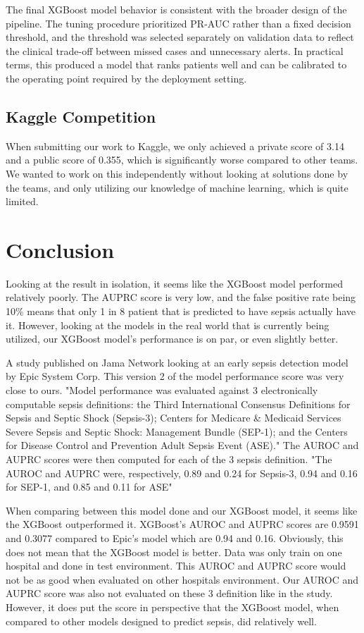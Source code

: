 \documentclass{article}
\begin{document}
The final XGBoost model behavior is consistent with the broader design of the pipeline. 
The tuning procedure prioritized PR-AUC rather than a fixed decision threshold, 
and the threshold was selected separately on validation data to reflect the clinical 
trade-off between missed cases and unnecessary alerts. In practical terms, 
this produced a model that ranks patients well and can be calibrated to 
the operating point required by the deployment setting.

\subsection{Kaggle Competition}
When submitting our work to Kaggle, we only achieved a private score of 3.14 and a public score of 0.355, which is significantly worse compared to other teams. We wanted to work on this independently without looking at solutions done by the teams, and only utilizing our knowledge of machine learning, which is quite limited. 


\newpage

\section{Conclusion}

Looking at the result in isolation, it seems like the XGBoost model performed relatively poorly. The AUPRC score is very low, and the false positive rate being 10\% means that only 1 in 8 patient that is predicted to have sepsis actually have it. However, looking at the models in the real world that is currently being utilized, our XGBoost model's performance is on par, or even slightly better. 

A study published on Jama Network looking at an early sepsis detection model by Epic System Corp. This version 2 of the model performance score was very close to ours. "Model performance was evaluated against 3 electronically computable sepsis definitions: the Third International Consensus Definitions for Sepsis and Septic Shock (Sepsis-3); Centers for Medicare & Medicaid Services Severe Sepsis and Septic Shock: Management Bundle (SEP-1); and the Centers for Disease Control and Prevention Adult Sepsis Event (ASE)." The AUROC and AUPRC scores were then computed for each of the 3 sepsis definition. "The AUROC and AUPRC were, respectively, 0.89 and 0.24 for Sepsis-3, 0.94  and 0.16  for SEP-1, and 0.85 and 0.11 for ASE"


When comparing between this model done and our XGBoost model, it seems like the XGBoost outperformed it. XGBoost's AUROC and AUPRC scores are 0.9591 and 0.3077 compared to Epic's model which are 0.94 and 0.16. Obviously, this does not mean that the XGBoost model is better. Data was only train on one hospital and done in test environment. This AUROC and AUPRC score would not be as good when evaluated on other hospitals environment. Our AUROC and AUPRC score was also not evaluated on these 3 definition like in the study. However, it does put the score in perspective that the XGBoost model, when compared to other models designed to predict sepsis, did relatively well. 
\end{document}
